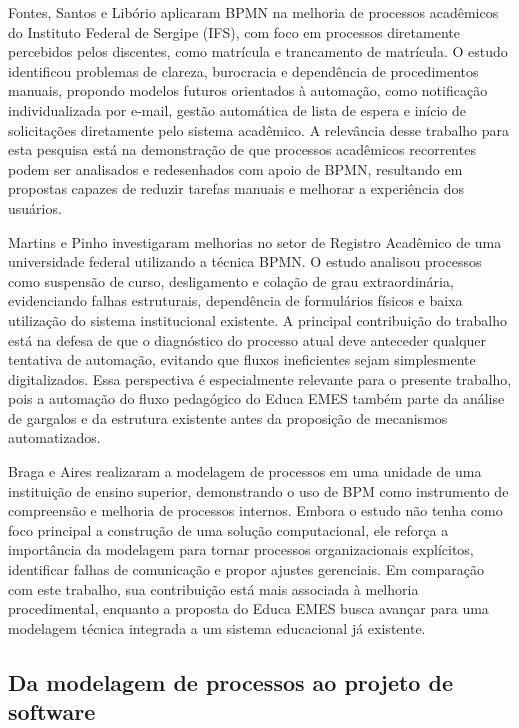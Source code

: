 Fontes, Santos e Libório \cite{FontesSantosLiborio2020} aplicaram BPMN na melhoria de processos 
acadêmicos do Instituto Federal de Sergipe (IFS), com foco em processos diretamente percebidos 
pelos discentes, como matrícula e trancamento de matrícula. O estudo identificou problemas de 
clareza, burocracia e dependência de procedimentos manuais, propondo modelos futuros orientados 
à automação, como notificação individualizada por e-mail, gestão automática de lista de espera e 
início de solicitações diretamente pelo sistema acadêmico. A relevância desse trabalho para esta 
pesquisa está na demonstração de que processos acadêmicos recorrentes podem ser analisados e 
redesenhados com apoio de BPMN, resultando em propostas capazes de reduzir tarefas manuais e 
melhorar a experiência dos usuários.

Martins e Pinho \cite{MartinsPinho2021} investigaram melhorias no setor de Registro Acadêmico 
de uma universidade federal utilizando a técnica BPMN. O estudo analisou processos como suspensão 
de curso, desligamento e colação de grau extraordinária, evidenciando falhas estruturais, 
dependência de formulários físicos e baixa utilização do sistema institucional existente. 
A principal contribuição do trabalho está na defesa de que o diagnóstico do processo atual 
deve anteceder qualquer tentativa de automação, evitando que fluxos ineficientes sejam simplesmente 
digitalizados. Essa perspectiva é especialmente relevante para o presente trabalho, pois a automação 
do fluxo pedagógico do Educa EMES também parte da análise de gargalos e da estrutura existente antes 
da proposição de mecanismos automatizados.

Braga e Aires \cite{BragaAires2024} realizaram a modelagem de processos em uma unidade de uma instituição de ensino superior, demonstrando o uso de BPM como instrumento de compreensão e melhoria de processos internos. Embora o estudo não tenha como foco principal a construção de uma solução computacional, ele reforça a importância da modelagem para tornar processos organizacionais explícitos, identificar falhas de comunicação e propor ajustes gerenciais. Em comparação com este trabalho, sua contribuição está mais associada à melhoria procedimental, enquanto a proposta do Educa EMES busca avançar para uma modelagem técnica integrada a um sistema educacional já existente.

\subsection{Da modelagem de processos ao projeto de software}
\label{sec:trabalhos-relacionados:modelagem-software}

